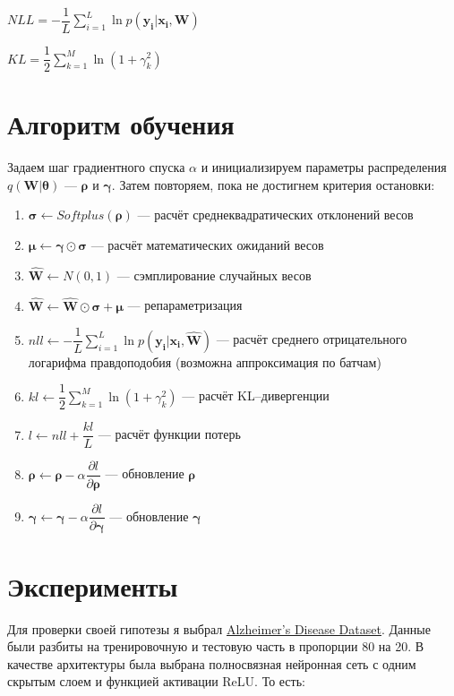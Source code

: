 \documentclass{article}
\begin{document}
$NLL = -\dfrac{1}{L}\sum_{i=1}^{L}{\ln{p( \mathbf{y_{i}} | \mathbf{x_{i}}, \mathbf{W})}}$

$KL = \dfrac{1}{2}\sum_{k=1}^{M}\ln({1 + \gamma_{k}^{2}})$

\section{Алгоритм обучения}
Задаем шаг градиентного спуска $\alpha$ и инициализируем параметры распределения $q(\mathbf{W} | \pmb{\theta})$ — $\pmb{\rho}$ и $\pmb{\gamma}$. Затем повторяем, пока не достигнем критерия остановки:
\begin{enumerate}
    \item $\pmb{\sigma} \leftarrow Softplus(\pmb{\rho})$ --- расчёт среднеквадратических отклонений весов
    \item $\pmb{\mu} \leftarrow \pmb{\gamma} \odot \pmb{\sigma}$ --- расчёт математических ожиданий весов
    \item $\hat{\mathbf{W}} \leftarrow N(0, 1)$ --- сэмплирование случайных весов
    \item $\hat{\mathbf{W}} \leftarrow \hat{\mathbf{W}} \odot \pmb{\sigma} + \pmb{\mu}$ --- репараметризация
    \item $nll \leftarrow -\dfrac{1}{L}\sum_{i=1}^{L}{\ln{p( \mathbf{y_{i}} | \mathbf{x_{i}}, \mathbf{\hat{W}})}}$ --- расчёт среднего отрицательного логарифма правдоподобия (возможна аппроксимация по батчам)
    \item $kl \leftarrow \dfrac{1}{2}\sum_{k=1}^{M}\ln({1 + \gamma_{k}^{2}})$ --- расчёт KL--дивергенции
    \item $l \leftarrow nll + \dfrac{kl}{L}$ --- расчёт функции потерь
    \item $\pmb{\rho} \leftarrow \pmb{\rho} - \alpha \dfrac{\partial l}{\partial \pmb{\rho}}$ --- обновление $\pmb{\rho}$
    \item $\pmb{\gamma} \leftarrow \pmb{\gamma} - \alpha \dfrac{\partial l}{\partial \pmb{\gamma}}$ --- обновление $\pmb{\gamma}$
\end{enumerate}

\section{Эксперименты}

Для проверки своей гипотезы я выбрал \href{https://www.kaggle.com/datasets/rabieelkharoua/alzheimers-disease-dataset}{Alzheimer's Disease Dataset}. Данные были разбиты на тренировочную и тестовую часть в пропорции 80 на 20. В качестве архитектуры была выбрана полносвязная нейронная сеть с одним скрытым слоем и функцией активации ReLU. То есть:
\end{document}
